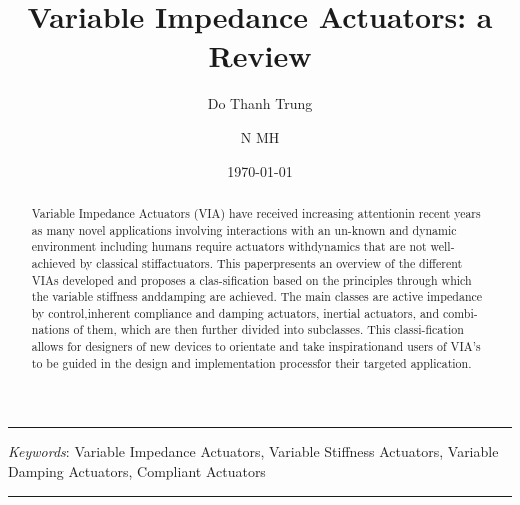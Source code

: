 \documentclass[12pt,a4paper]{article}
\title{Variable Impedance Actuators: a Review}
\author[1,2]{Do Thanh Trung}
\author[2]{N MH}
\affil[1]{\textit{HELLA VIETNAM}}
\affil[2]{\textit{HCM UTE, \href{https://www.hcmute.edu.vn}
        {\texttt
            {
                \fontfamily{pcr}\selectfont www.hcmute.edu.vn
            }
        }
    }
}
\date{\today}
\begin{document}
    \maketitle
    \noindent\rule{\textwidth}{0.4pt}
    \begin{abstract}
        Variable Impedance Actuators (VIA) have received increasing attentionin recent years as many novel applications involving interactions with an un-known and dynamic environment including humans require actuators withdynamics that are not well-achieved by classical stiffactuators. This paperpresents an overview of the different VIAs developed and proposes a clas-sification based on the principles through which the variable stiffness anddamping are achieved. The main classes are active impedance by control,inherent compliance and damping actuators, inertial actuators, and combi-nations of them, which are then further divided into subclasses. This classi-fication allows for designers of new devices to orientate and take inspirationand users of VIA’s to be guided in the design and implementation processfor their targeted application.
        
    \end{abstract}
    \textit{Keywords}: Variable Impedance Actuators, Variable Stiffness Actuators, Variable Damping Actuators, Compliant Actuators
    
    \noindent\rule{\textwidth}{0.4pt}
\end{document}

